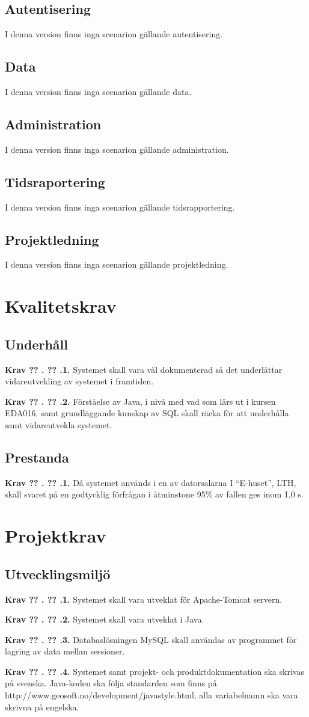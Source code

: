 \documentclass[a4paper]{article}
\newcommand\getcurrentref[1]{%
 \ifnumequal{\value{#1}}{0}
  {??}
  {\the\value{#1}}%
}
\newcommand\requirement[2]{
	\numberedrow{Krav}{#1}{#2}
}
\newcommand\numberedrow[3]{
	\noindent
	\textbf{#1 \getcurrentref{section}.\getcurrentref{subsection}.#2.} #3
	
}
\begin{document}
\subsection{Autentisering}
I denna version finns inga scenarion gällande autentisering.
\subsection{Data}
I denna version finns inga scenarion gällande data.
\subsection{Administration}
I denna version finns inga scenarion gällande administration.
\subsection{Tidsraportering}
I denna version finns inga scenarion gällande tidsrapportering.
\subsection{Projektledning}
I denna version finns inga scenarion gällande projektledning.
\section{Kvalitetskrav}
\subsection{Underhåll}
\requirement{1}{Systemet skall vara väl dokumenterad så det underlättar vidareutvekling av systemet i framtiden.}
\requirement{2}{Förståelse av Java, i nivå med vad som lärs ut i kursen EDA016, samt grundläggande kunskap av SQL skall räcka för att underhålla samt vidareutvekla systemet.}
\subsection{Prestanda}
\requirement{1}{Då systemet används i en av datorsalarna I “E-huset”, LTH, skall svaret på en godtycklig förfrågan i åtminstone 95\% av fallen ges inom 1,0 s.}
\section{Projektkrav}
\subsection{Utvecklingsmiljö}
\requirement{1}{Systemet skall vara utveklat för Apache-Tomcat servern.}
\requirement{2}{Systemet skall vara utveklat i Java.}
\requirement{3}{Databaslösningen MySQL skall användas av programmet för lagring av data mellan sessioner.}
\requirement{4}{Systemet samt projekt- och produktdokumentation ska skrivas på svenska. Java-koden ska följa standarden som finns på http://www.geosoft.no/development/javastyle.html, alla variabelnamn ska vara skrivna på engelska.}
\end{document}

